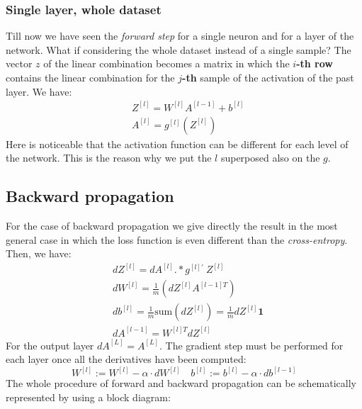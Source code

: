 \subsubsection{Single layer, whole dataset}
Till now we have seen the \textit{forward step} for a single neuron and for a layer of the network. What if considering the whole dataset instead of a single sample? The vector $z$ of the linear combination becomes a matrix in which the \textbf{$i$-th row} contains the linear combination for the \textbf{$j$-th} sample of the activation of the past layer. We have:
\begin{equation}
    \begin{aligned}
        &Z^{[l]}=W^{[l]}A^{[l-1]}+b^{[l]}\\
        &A^{[l]}=g^{[l]}(Z^{[l]})
    \end{aligned}
\end{equation}
Here is noticeable that the activation function can be different for each level of the network. This is the reason why we put the $l$ superposed also on the $g$.
\subsection{Backward propagation}
For the case of backward propagation we give directly the result in the most general case in which the loss function is even different than the \textit{cross-entropy}. Then, we have:
\begin{equation}
    \begin{aligned}
        &dZ^{[l]}=dA^{[l]}.*g^{[l]'} \ Z^{[l]}\\
        &dW^{[l]}=\frac{1}{m} (dZ^{[l]}A^{[l-1]T})\\
        &db^{[l]}=\frac{1}{m} \text{sum}({dZ^{[l]}})=\frac{1}{m}dZ^{[l]}\mathbf{1}\\
        &dA^{[l-1]}=W^{[l]T} dZ^{[l]}
    \end{aligned}
\end{equation}
For the output layer $dA^{[L]}=A^{[L]}$. The gradient step must be performed for each layer once all the derivatives have been computed: 
{\large{
    \begin{equation}
        W^{[l]}:= W^{[l]}-\alpha\cdot{dW^{[l]}} \quad    b^{[l]}:=b^{[l]}-\alpha\cdot{db^{[l-1]}}
    \end{equation} 
}}
The whole procedure of forward and backward propagation can be schematically represented by using a block diagram: 

